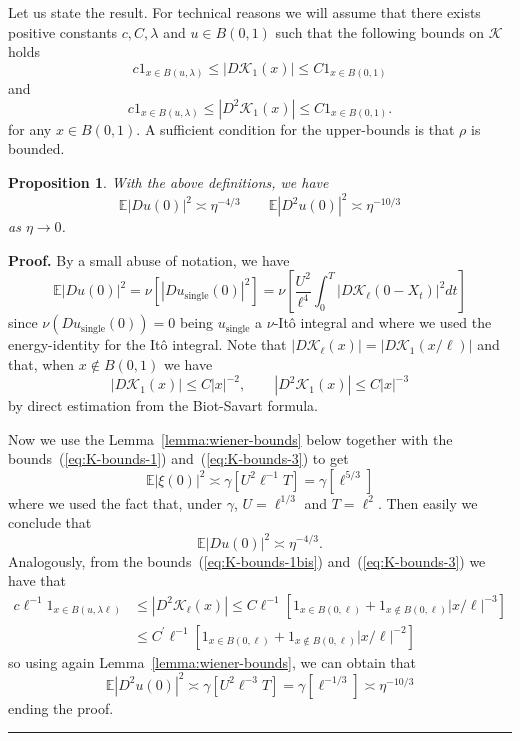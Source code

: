 \documentclass[11pt]{preprint}
\newtheorem{proposition}[theorem]{Proposition}
\newenvironment{proof}[1][Proof]{\textbf{#1.} }{\ \rule{0.5em}{0.5em}}
\begin{document}
Let us state the result. For technical reasons we will assume that there
exists positive constants $c,C,\lambda$ and $u \in B(0,1)$ such that the
following bounds on $\mathcal{K}$ holds
\begin{equation}
\label{eq:K-bounds-1}
c 1_{x \in B(u,\lambda)} \le|D \mathcal{K}_{1}(x)| \le C 1_{x \in B(0,1)}%
\end{equation}
and
\begin{equation}
\label{eq:K-bounds-1bis}
c 1_{x \in B(u,\lambda)} \le|D^{2} \mathcal{K}_{1}(x)| \le C 1_{x \in B(0,1)} .
\end{equation}
for any $x \in B(0,1)$. A sufficient condition for the upper-bounds is that
$\rho$ is bounded.

\begin{proposition}
With the above definitions, we have
\begin{equation}
\mathbb{E}|Du(0)|^{2}\asymp\eta^{-4/3}\qquad\mathbb{E}|D^{2}u(0)|^{2}%
\asymp\eta^{-10/3}\label{eq:vortx-cnj}%
\end{equation}
as $\eta\rightarrow0$.
\end{proposition}

\begin{proof}
By a small abuse of notation, we have
\[
\mathbb{E}|Du(0)|^{2}=\nu\left[  |Du_{\text{single}}(0)|^{2}\right]
=\nu\left[  \frac{U^{2}}{\ell^{4}}\int_{0}^{T}|D\mathcal{K}_{\ell}(0-X_{t}%
)|^{2}dt\right]
\]
since $\nu(Du_{\text{single}}(0))=0$ being $u_{\text{single}}$ a $\nu$-It\^{o}
integral and where we used the energy-identity for the It\^{o} integral. Note
that $|D\mathcal{K}_{\ell}(x)|=|D\mathcal{K}_{1}(x/\ell)|$ and that, when $x\not \in B(0,1)$ we
have
\begin{equation}
|D\mathcal{K}_{1}(x)|\leq C|x|^{-2},\qquad|D^{2}\mathcal{K}_{1}(x)|\leq C|x|^{-3}%
\label{eq:K-bounds-3}%
\end{equation}
by direct estimation from the Biot-Savart formula.

Now we use the Lemma~\ref{lemma:wiener-bounds} below together with the
bounds~(\ref{eq:K-bounds-1}) and~(\ref{eq:K-bounds-3}) to get
\[
\mathbb{E}|\xi(0)|^{2}\asymp\gamma\left[  U^{2}\ell^{-1}T\right]
=\gamma\left[  \ell^{5/3}\right]
\]
where we used the fact that, under $\gamma$, $U=\ell^{1/3}$ and $T=\ell^{2}$.
Then easily we conclude that
\[
\mathbb{E}|Du(0)|^{2}\asymp\eta^{-4/3}.
\]
Analogously, from the bounds~(\ref{eq:K-bounds-1bis}) and~(\ref{eq:K-bounds-3})
we have that
\[%
\begin{split}
c\ell^{-1}1_{x\in B(u,\lambda\ell)} &  \leq|D^{2}\mathcal{K}_{\ell}(x)|\leq C\ell
^{-1}\left[  1_{x\in B(0,\ell)}+1_{x\not \in B(0,\ell)}|x/\ell|^{-3}\right] \\
&  \leq C^{\prime}\ell^{-1}\left[  1_{x\in B(0,\ell)}+1_{x\not \in B(0,\ell
)}|x/\ell|^{-2}\right]
\end{split}
\]
so using again Lemma~\ref{lemma:wiener-bounds}, we can obtain that
\[
\mathbb{E}|D^{2}u(0)|^{2}\asymp\gamma\left[  U^{2}\ell^{-3}T\right]
=\gamma\left[  \ell^{-1/3}\right]  \asymp\eta^{-10/3}%
\]
ending the proof.
\end{proof}
\end{document}
